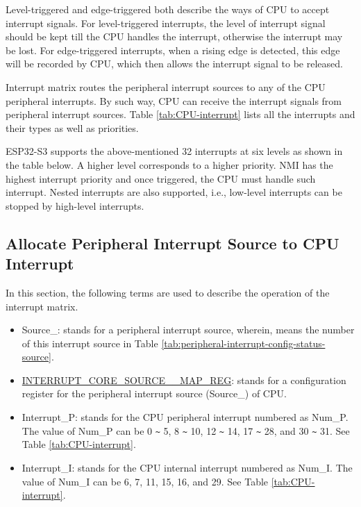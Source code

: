 \documentclass[main\_\_EN.tex]{subfiles}
\begin{document}
Level-triggered and edge-triggered both describe the ways of CPU to accept interrupt signals. For level-triggered interrupts, the level of interrupt signal should be kept till the CPU handles the interrupt, otherwise the interrupt may be lost. For edge-triggered interrupts, when a rising edge is detected, this edge will be recorded by CPU, which then allows the interrupt signal to be released.

Interrupt matrix routes the peripheral interrupt sources to any of the CPU peripheral interrupts. By such way, CPU can receive the interrupt signals from peripheral interrupt sources. Table \ref{tab:CPU-interrupt} lists all the interrupts and their types as well as priorities.

ESP32-S3 supports the above-mentioned 32 interrupts at six levels as shown in the table below. A higher level corresponds to a higher priority. NMI has the highest interrupt priority and once triggered, the CPU must handle such interrupt. Nested interrupts are also supported, i.e., low-level interrupts can be stopped by high-level interrupts.




\subsection{Allocate Peripheral Interrupt Source to CPU Interrupt}

In this section, the following terms are used to describe the operation of the interrupt matrix.

\begin{itemize}

\item Source\_: stands for a peripheral interrupt source, wherein,  means the number of this interrupt source in Table \ref{tab:peripheral-interrupt-config-status-source}.

\item \hyperref[regdesc:INTERRUPTCORE0CACHECORE1ACSINTMAPREG]{INTERRUPT\_CORE\_SOURCE\_\_MAP\_REG}: stands for a configuration register for the peripheral interrupt source (Source\_) of CPU.

\item Interrupt\_P: stands for the CPU peripheral interrupt numbered as Num\_P. The value of Num\_P can be 0 \verb+~+ 5, 8 \verb+~+ 10, 12 \verb+~+ 14, 17 \verb+~+ 28, and 30 \verb+~+ 31. See Table \ref{tab:CPU-interrupt}.

\item Interrupt\_I: stands for the CPU internal interrupt numbered as Num\_I. The value of Num\_I can be 6, 7, 11, 15, 16, and 29. See Table \ref{tab:CPU-interrupt}.
\end{itemize}
\end{document}
